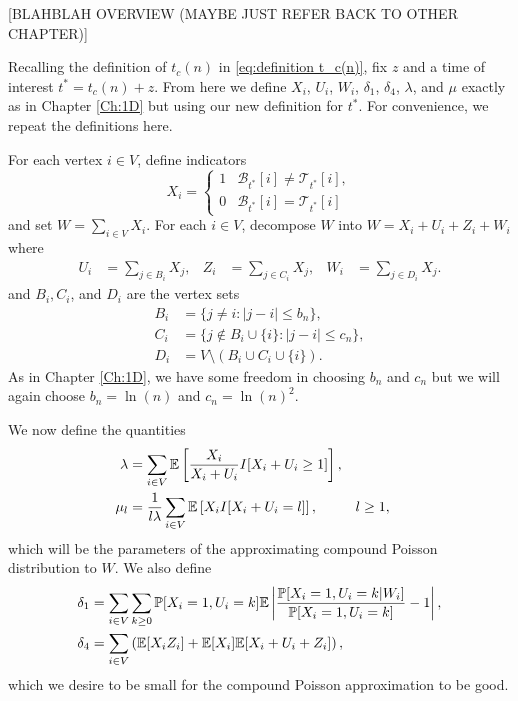 [BLAHBLAH OVERVIEW (MAYBE JUST REFER BACK TO OTHER CHAPTER)]

Recalling the definition of $t_c(n)$ in \eqref{eq:definition t_c(n)}, fix $z$ and a time of interest $t^* = t_c(n) + z$. From here we define $X_i$, $U_i$, $W_i$, $\delta_1$, $\delta_4$, $\lambda$, and $\mu$ exactly as in Chapter \ref{Ch:1D} but using our new definition for $t^*$. For convenience, we repeat the definitions here.

For each vertex $i \in V$, define indicators
	\begin{equation}
		X_i = 
		\begin{cases}
			1 & \mathscr{B}_{t^*}[i] \neq \mathscr{T}_{t^*}[i],\\
			0 & \mathscr{B}_{t^*}[i] = \mathscr{T}_{t^*}[i]
		\end{cases}
	\end{equation}
	and set $W = \sum_{i \in V} X_i$.
	For each $i \in V$, decompose $W$ into $W = X_i + U_i + Z_i + W_i$ where
	\begin{align}
		U_i &= \sum_{j \in B_i} X_j, &
		Z_i &= \sum_{j \in C_i} X_j, &
		W_i &= \sum_{j \in D_i} X_j.
	\end{align}
	and $B_i, C_i$, and $D_i$ are the vertex sets
	\begin{align}
		B_i &= \{j\neq i : |j - i| \leq b_n \},\\
		C_i &= \{j\notin B_i\cup \{i\}: |j - i| \leq c_n \},\\
		D_i &= V \setminus (B_i \cup C_i \cup \{i\}).
	\end{align}
	As in Chapter \ref{Ch:1D}, we have some freedom in choosing $b_n$ and $c_n$ but we will again choose $b_n = \ln(n)$ and $c_n = \ln(n)^2$.

	We now define the quantities
	\begin{align}
		\lambda &= \sum_{i \in V} \mathbb{E}\left[\frac{X_i}{X_i + U_i} I[ X_i + U_i \geq 1] \right],\\
		\mu_l &= \frac{1}{l \lambda} \sum_{i \in V} \mathbb{E}\left[ X_i I[X_i + U_i = l] \right], && l\geq 1,
	\end{align}
	which will be the parameters of the approximating compound Poisson distribution to $W$. We also define
	\begin{align}
		\delta_1 &= \sum_{i \in V}  \sum_{k \geq 0} \mathbb{P}[X_i = 1, U_i = k] \mathbb{E} \left|\frac{\mathbb{P}[X_i = 1, U_i = k|W_i]}{\mathbb{P}[X_i = 1, U_i = k]} - 1 \right|, \label{eq:delta1 nD}\\ 
		\delta_4 &= \sum_{i \in V} \left( \mathbb{E}[X_i Z_i] + \mathbb{E}[X_i] \mathbb{E}[X_i + U_i + Z_i] \right), \label{eq:delta4 nD}
	\end{align}
	which we desire to be small for the compound Poisson approximation to be good.

